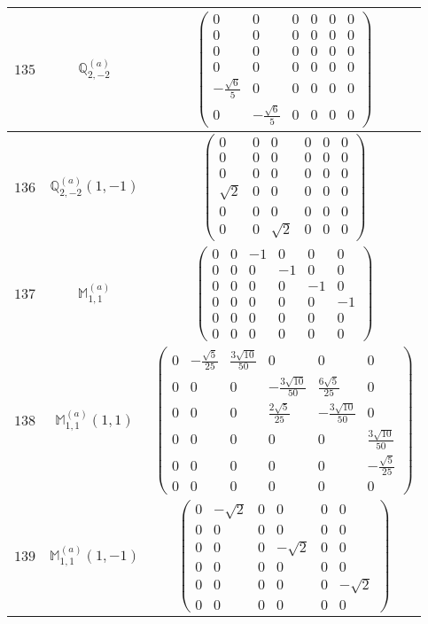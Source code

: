 \documentclass[fleqn,8pt,landscape]{jsarticle}
\begin{document}
\begin{center}
\begin{longtable}{ccc}
$ 135 $ & $ \mathbb{Q}_{2,-2}^{(a)} $ & $ \begin{pmatrix} 0 & 0 & 0 & 0 & 0 & 0 \\ 0 & 0 & 0 & 0 & 0 & 0 \\ 0 & 0 & 0 & 0 & 0 & 0 \\ 0 & 0 & 0 & 0 & 0 & 0 \\ - \frac{\sqrt{6}}{5} & 0 & 0 & 0 & 0 & 0 \\ 0 & - \frac{\sqrt{6}}{5} & 0 & 0 & 0 & 0 \end{pmatrix} $ \\ \hline
$ 136 $ & $ \mathbb{Q}_{2,-2}^{(a)}(1,-1) $ & $ \begin{pmatrix} 0 & 0 & 0 & 0 & 0 & 0 \\ 0 & 0 & 0 & 0 & 0 & 0 \\ 0 & 0 & 0 & 0 & 0 & 0 \\ \sqrt{2} & 0 & 0 & 0 & 0 & 0 \\ 0 & 0 & 0 & 0 & 0 & 0 \\ 0 & 0 & \sqrt{2} & 0 & 0 & 0 \end{pmatrix} $ \\ \hline
$ 137 $ & $ \mathbb{M}_{1,1}^{(a)} $ & $ \begin{pmatrix} 0 & 0 & -1 & 0 & 0 & 0 \\ 0 & 0 & 0 & -1 & 0 & 0 \\ 0 & 0 & 0 & 0 & -1 & 0 \\ 0 & 0 & 0 & 0 & 0 & -1 \\ 0 & 0 & 0 & 0 & 0 & 0 \\ 0 & 0 & 0 & 0 & 0 & 0 \end{pmatrix} $ \\ \hline
$ 138 $ & $ \mathbb{M}_{1,1}^{(a)}(1,1) $ & $ \begin{pmatrix} 0 & - \frac{\sqrt{5}}{25} & \frac{3 \sqrt{10}}{50} & 0 & 0 & 0 \\ 0 & 0 & 0 & - \frac{3 \sqrt{10}}{50} & \frac{6 \sqrt{5}}{25} & 0 \\ 0 & 0 & 0 & \frac{2 \sqrt{5}}{25} & - \frac{3 \sqrt{10}}{50} & 0 \\ 0 & 0 & 0 & 0 & 0 & \frac{3 \sqrt{10}}{50} \\ 0 & 0 & 0 & 0 & 0 & - \frac{\sqrt{5}}{25} \\ 0 & 0 & 0 & 0 & 0 & 0 \end{pmatrix} $ \\ \hline
$ 139 $ & $ \mathbb{M}_{1,1}^{(a)}(1,-1) $ & $ \begin{pmatrix} 0 & - \sqrt{2} & 0 & 0 & 0 & 0 \\ 0 & 0 & 0 & 0 & 0 & 0 \\ 0 & 0 & 0 & - \sqrt{2} & 0 & 0 \\ 0 & 0 & 0 & 0 & 0 & 0 \\ 0 & 0 & 0 & 0 & 0 & - \sqrt{2} \\ 0 & 0 & 0 & 0 & 0 & 0 \end{pmatrix} $ \\ \hline

\end{longtable}
\end{center}
\end{document}
